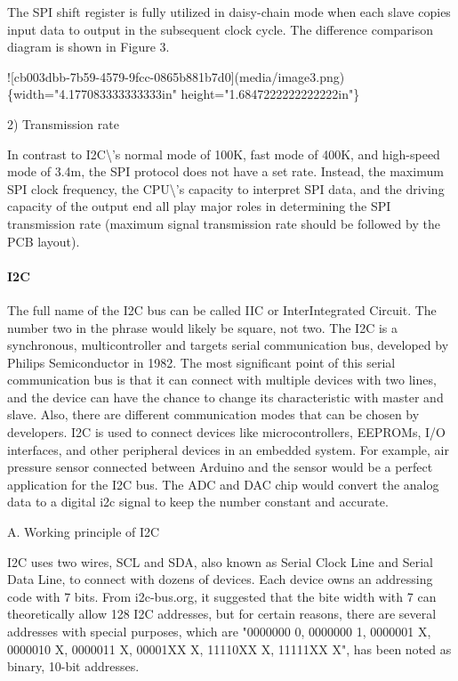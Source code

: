 \documentclass[12pt,a4paper]{article}
\numberwithin{equation}{section}
\begin{document}
    The SPI shift register is fully utilized in daisy-chain mode when
    each slave copies input data to output in the subsequent clock
    cycle. The difference comparison diagram is shown in Figure 3.

    ![cb003dbb-7b59-4579-9fcc-0865b881b7d0](media/image3.png)\{width="4.177083333333333in"
    height="1.6847222222222222in"\}

2)  Transmission rate

    In contrast to I2C\textbackslash{}'s normal mode of 100K, fast mode of 400K, and
    high-speed mode of 3.4m, the SPI protocol does not have a set rate.
    Instead, the maximum SPI clock frequency, the CPU\textbackslash{}'s capacity to
    interpret SPI data, and the driving capacity of the output end all
    play major roles in determining the SPI transmission rate (maximum
    signal transmission rate should be followed by the PCB layout).

\paragraph{I2C}

The full name of the I2C bus can be called IIC or InterIntegrated
Circuit. The number two in the phrase would likely be square, not two.
The I2C is a synchronous, multicontroller and targets serial
communication bus, developed by Philips Semiconductor in 1982. The most
significant point of this serial communication bus is that it can
connect with multiple devices with two lines, and the device can have
the chance to change its characteristic with master and slave. Also,
there are different communication modes that can be chosen by
developers. I2C is used to connect devices like microcontrollers,
EEPROMs, I/O interfaces, and other peripheral devices in an embedded
system. For example, air pressure sensor connected between Arduino and
the sensor would be a perfect application for the I2C bus. The ADC and
DAC chip would convert the analog data to a digital i2c signal to keep
the number constant and accurate.

A.  Working principle of I2C

    I2C uses two wires, SCL and SDA, also known as Serial Clock Line and
    Serial Data Line, to connect with dozens of devices. Each device
    owns an addressing code with 7 bits. From i2c-bus.org, it suggested
    that the bite width with 7 can theoretically allow 128 I2C
    addresses, but for certain reasons, there are several addresses with
    special purposes, which are "0000000 0, 0000000 1, 0000001 X,
    0000010 X, 0000011 X, 00001XX X, 11110XX X, 11111XX X", has been
    noted as binary, 10-bit addresses.
\end{document}
